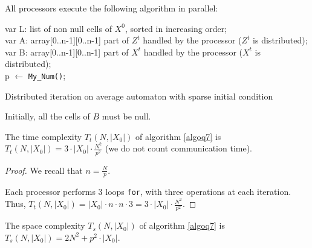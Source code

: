 
All processors execute the following algorithm in parallel:

\begin{algorithm}[H]
    \DontPrintSemicolon
    \LinesNotNumbered
    var L: list of non null cells of $X^0$, sorted in increasing order; \\
    var A: array[0..n-1][0..n-1] part of $Z^t$ handled by the processor ($Z^t$ is distributed); \\
    var B: array[0..n-1][0..n-1] part of $X^t$ handled by the processor ($X^t$ is distributed); \\ 
    p $\leftarrow$ \texttt{My\_Num()};\\
\caption{Distributed iteration on average automaton with sparse initial condition\label{algoq7}}
\end{algorithm}

Initially, all the cells of $B$ must be null.

\begin{prop}
 The time complexity $T_t(N,|X_0|)$ of algorithm \ref{algoq7} is $T_t(N,|X_0|) = 3 \cdot |X_0| \cdot \frac{N^2}{p^2}$ (we do not count communication time).
\end{prop}

\begin{proof}
 We recall that $n = \frac{N}{p}$.
 
 Each processor performs 3 loops \texttt{for}, with three operations at each iteration. Thus, $T_t(N,|X_0|) = |X_0| \cdot n \cdot n \cdot 3 = 3 \cdot |X_0| \cdot \frac{N^2}{p^2}$.
\end{proof}

\begin{prop}
 The space complexity $T_s(N,|X_0|)$ of algorithm \ref{algoq7} is $T_s(N,|X_0|) = 2 N^2 + p^2 \cdot |X_0|$.
\end{prop}

